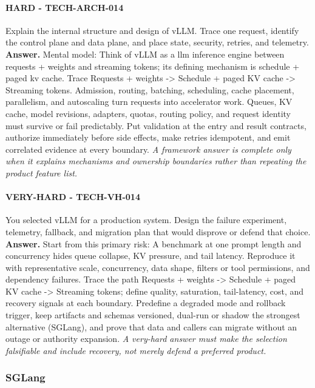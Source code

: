 \paragraph{HARD - TECH-ARCH-014} Explain the internal structure and design of vLLM. Trace one request, identify the control plane and data plane, and place state, security, retries, and telemetry.
\textbf{Answer.} Mental model: Think of vLLM as a llm inference engine between requests + weights and streaming tokens; its defining mechanism is schedule + paged kv cache. Trace Requests + weights -> Schedule + paged KV cache -> Streaming tokens. Admission, routing, batching, scheduling, cache placement, parallelism, and autoscaling turn requests into accelerator work. Queues, KV cache, model revisions, adapters, quotas, routing policy, and request identity must survive or fail predictably. Put validation at the entry and result contracts, authorize immediately before side effects, make retries idempotent, and emit correlated evidence at every boundary.
\textit{A framework answer is complete only when it explains mechanisms and ownership boundaries rather than repeating the product feature list.}
\paragraph{VERY-HARD - TECH-VH-014} You selected vLLM for a production system. Design the failure experiment, telemetry, fallback, and migration plan that would disprove or defend that choice.
\textbf{Answer.} Start from this primary risk: A benchmark at one prompt length and concurrency hides queue collapse, KV pressure, and tail latency. Reproduce it with representative scale, concurrency, data shape, filters or tool permissions, and dependency failures. Trace the path Requests + weights -> Schedule + paged KV cache -> Streaming tokens; define quality, saturation, tail-latency, cost, and recovery signals at each boundary. Predefine a degraded mode and rollback trigger, keep artifacts and schemas versioned, dual-run or shadow the strongest alternative (SGLang), and prove that data and callers can migrate without an outage or authority expansion.
\textit{A very-hard answer must make the selection falsifiable and include recovery, not merely defend a preferred product.}
\subsubsection*{SGLang}
